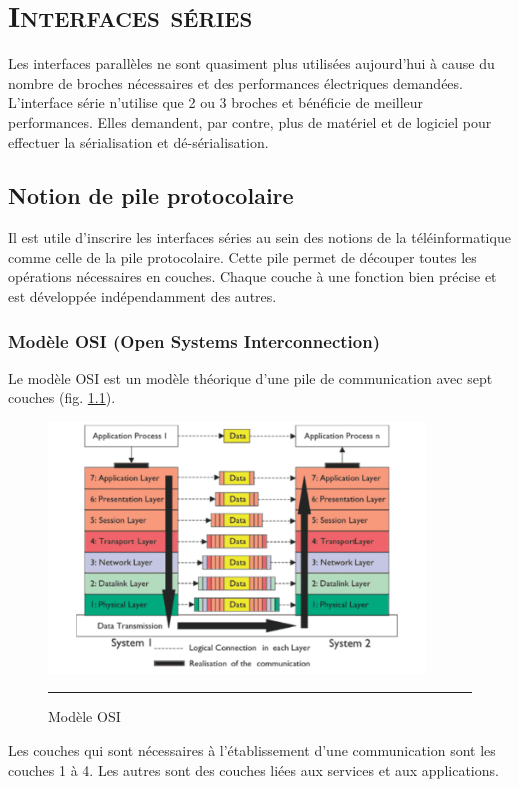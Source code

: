 \chapter{\textsc{Interfaces séries}}

Les interfaces parallèles ne sont quasiment plus utilisées aujourd'hui à cause du nombre de broches nécessaires et des performances électriques demandées. L'interface série n'utilise que 2 ou 3 broches et bénéficie de meilleur performances. Elles demandent, par contre, plus de matériel et de logiciel pour effectuer la sérialisation et dé-sérialisation.


\section{Notion de pile protocolaire}
Il est utile d'inscrire les interfaces séries au sein des notions de la téléinformatique comme celle de la pile protocolaire. Cette pile permet de découper toutes les opérations nécessaires en couches. Chaque couche à une fonction bien précise et est développée indépendamment des autres. 

\subsection{Modèle OSI (Open Systems Interconnection)}
Le modèle OSI est un modèle théorique d'une pile de communication avec sept couches (fig. \ref{fig:osi}). 

\begin{figure}[htb]
  \centering
  \includegraphics[angle=0, width=10cm]{./Figures/serial/modelOSI.pdf}
  \rule{35em}{0.5pt}
  \caption[osi]{Modèle OSI}
  \label{fig:osi}
\end{figure}

Les couches qui sont nécessaires à l'établissement d'une communication sont les couches 1 à 4. Les autres sont des couches liées aux services et aux applications.

